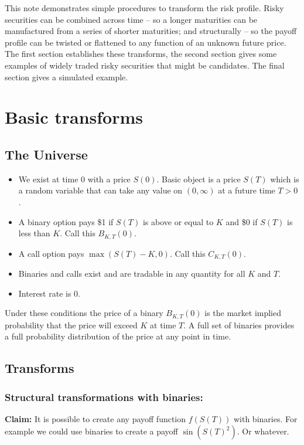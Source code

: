 \documentclass{tran-l}
\theoremstyle{definition}
\theoremstyle{remark}
\numberwithin{equation}{subsection}
\begin{document}
This note demonstrates simple procedures to transform the risk profile. Risky securities can be combined across time -- so a longer maturities can be manufactured from a series of shorter maturities; and structurally -- so the payoff profile can be twisted or flattened to any function of an unknown future price. The first section establishes these transforms, the second section gives some examples of widely traded risky securities that might be candidates. The final section gives a simulated example. 

\section*{Basic transforms}

\subsection*{The Universe}

\begin{itemize}
\item We exist at time $0$ with a price $S(0)$. Basic object is a price $S(T)$ which is a random variable that can take any value on $(0,\infty)$ at a future time $T>0$.
\item A binary option pays \$1 if $S(T)$ is above or equal to $K$ and \$0 if $S(T)$ is less than $K$. Call this $B_{K,T}(0)$.
\item A call option pays $\max(S(T)-K,0)$. Call this $C_{K,T}(0)$.
\item Binaries and calls exist and are tradable in any quantity for all $K$ and $T$.
\item Interest rate is 0. 
\end{itemize}

Under these conditions the price of a binary $B_{K,T}(0)$ is the market implied probability that the price will exceed $K$ at time $T$. A full set of binaries provides a full probability distribution of the price at any point in time.

\subsection*{Transforms}

\subsubsection*{Structural transformations with binaries:}

\textbf{Claim:} It is possible to create any payoff function $f(S(T))$ with binaries. For example we could use binaries to create a payoff $\sin(S(T)^2)$. Or whatever.
\end{document}
